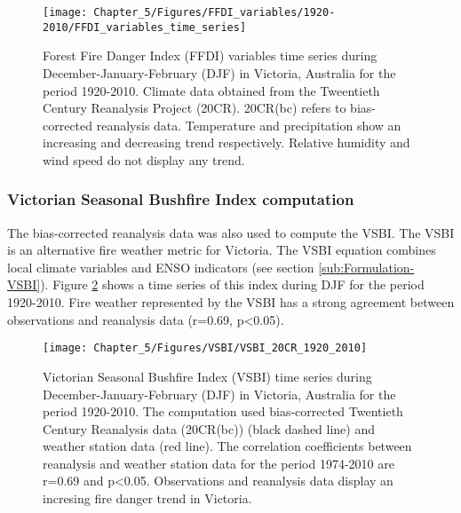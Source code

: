 \begin{figure}[h]
\noindent \begin{centering}
\texttt{[image: Chapter\_5/Figures/FFDI\_variables/1920-2010/FFDI\_variables\_time\_series]}
\par\end{centering}

\caption[Forest Fire Danger Index (FFDI) variables time series during December-January-February
(DJF) in Victoria, Australia for the period 1920-2010]{Forest Fire Danger Index (FFDI) variables time series during December-January-February
(DJF) in Victoria, Australia for the period 1920-2010. Climate data
obtained from the Tweentieth Century Reanalysis Project (20CR). 20CR(bc)
refers to bias-corrected reanalysis data. Temperature and precipitation
show an increasing and decreasing trend respectively. Relative humidity
and wind speed do not display any trend. \label{fig:Forest Fire Danger Index (FFDI) variables time series during December-January-February in Victoria, Australia for the period 1920-2010}}


\end{figure}



\subsubsection{Victorian Seasonal Bushfire Index computation}

The bias-corrected reanalysis data was also used to compute the VSBI.
The VSBI is an alternative fire weather metric for Victoria. The VSBI
equation combines local climate variables and ENSO indicators (see
section \ref{sub:Formulation-VSBI}). Figure \ref{fig:Victorian Seasonal Bushfire Index time series during December-January-February in Victoria, Australia for the period 1920-2010}
shows a time series of this index during DJF for the period 1920-2010.
Fire weather represented by the VSBI has a strong agreement between
observations and reanalysis data (r=0.69, p<0.05).

\begin{figure}[h]
\noindent \begin{centering}
\texttt{[image: Chapter\_5/Figures/VSBI/VSBI\_20CR\_1920\_2010]}
\par\end{centering}

\caption[Victorian Seasonal Bushfire Index (VSBI) time series during December-January-February
(DJF) in Victoria, Australia for the period 1920-2010]{Victorian Seasonal Bushfire Index (VSBI) time series during December-January-February
(DJF) in Victoria, Australia for the period 1920-2010. The computation
used bias-corrected Twentieth Century Reanalysis data (20CR(bc)) (black
dashed line) and weather station data (red line). The correlation
coefficients between reanalysis and weather station data for the period
1974-2010 are r=0.69 and p<0.05. Observations and reanalysis data
display an incresing fire danger trend in Victoria. \label{fig:Victorian Seasonal Bushfire Index time series during December-January-February in Victoria, Australia for the period 1920-2010} }
\end{figure}


